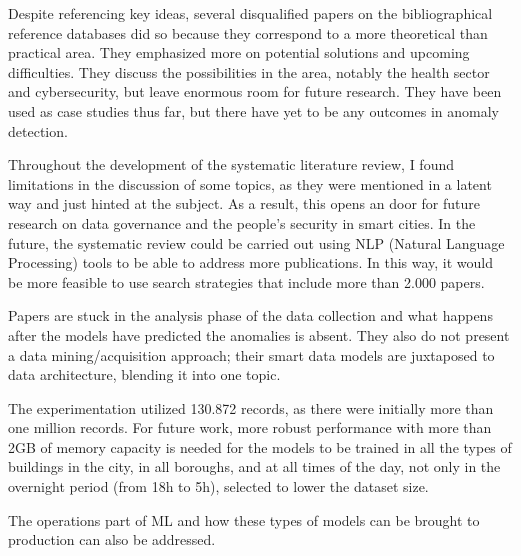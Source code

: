 \documentclass[a4paper,12pt,twoside]{ThesisStyle}
\begin{document}
Despite referencing key ideas, several disqualified papers on the bibliographical reference databases did so because they correspond to a more theoretical than practical area. They emphasized more on potential solutions and upcoming difficulties. They discuss the possibilities in the area, notably the health sector and cybersecurity, but leave enormous room for future research. They have been used as case studies thus far, but there have yet to be any outcomes in anomaly detection. 

Throughout the development of the systematic literature review, I found limitations in the discussion of some topics, as they were mentioned in a latent way and just hinted at the subject. As a result, this opens an door for future research on data governance and the people's security in smart cities. In the future, the systematic review could be carried out using NLP (Natural Language Processing) tools to be able to address more publications. In this way, it would be more feasible to use search strategies that include more than 2.000 papers.

Papers are stuck in the analysis phase of the data collection and what happens after the models have predicted the anomalies is absent. They also do not present a data mining/acquisition approach; their smart data models are juxtaposed to data architecture, blending it into one topic.

The experimentation utilized 130.872 records, as there were initially more than one million records. For future work, more robust performance with more than 2GB of memory capacity is needed for the models to be trained in all the types of buildings in the city, in all boroughs, and at all times of the day, not only in the overnight period (from 18h to 5h), selected to lower the dataset size.

The operations part of ML and how these types of models can be brought to production can also be addressed.

\backmatter






\end{document}
